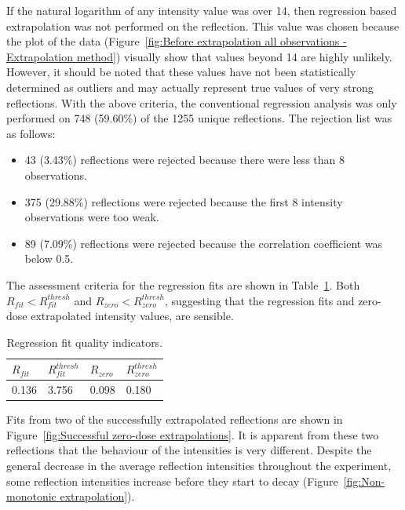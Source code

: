 If the natural logarithm of any intensity value was over 14, then regression based extrapolation was not performed on the reflection.
This value was chosen because the plot of the data (Figure~\ref{fig:Before extrapolation all observations - Extrapolation method}) visually show that values beyond 14 are highly unlikely.
However, it should be noted that these values have not been statistically determined as outliers and may actually represent true values of very strong reflections.
With the above criteria, the conventional regression analysis was only performed on 748 (59.60\%) of the 1255 unique reflections.
The rejection list was as follows:
\begin{itemize}
    \item 43 (3.43\%) reflections were rejected because there were less than 8 observations.
    \item 375 (29.88\%) reflections were rejected because the first 8 intensity observations were too weak.
    \item 89 (7.09\%) reflections were rejected because the correlation coefficient was below 0.5.
\end{itemize}
The assessment criteria for the regression fits are shown in Table~\ref{tab:R_fit and R_zero values}.
Both $R_{fit} < R^{thresh}_{fit}$ and $R_{zero} < R^{thresh}_{zero}$, suggesting that the regression fits and zero-dose extrapolated intensity values, are sensible.
\begin{table}[ht!]
	\caption[Regression fit quality indicators.]{Regression fit quality indicators.}
	\centering
	\begin{tabular}{p{1.5cm} | p{1.5cm} | p{1.5cm} | p{1.5cm}}
		$R_{fit}$     & $R^{thresh}_{fit}$    & $R_{zero}$   & $R^{thresh}_{zero}$  \\
		\hline
		0.136        & 3.756                & 0.098       & 0.180        \\
	\end{tabular}
	\label{tab:R_fit and R_zero values}
\end{table}
Fits from two of the successfully extrapolated reflections are shown in Figure~\ref{fig:Successful zero-dose extrapolations}.
It is apparent from these two reflections that the behaviour of the intensities is very different.
Despite the general decrease in the average reflection intensities throughout the experiment, some reflection intensities increase before they start to decay (Figure~\ref{fig:Non-monotonic extrapolation}).
